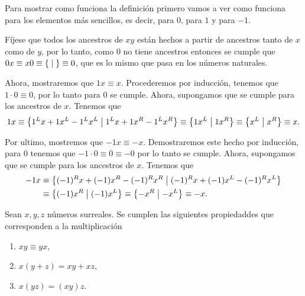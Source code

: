     \begin{example}
        Para mostrar como funciona la definici\'on primero vamos a ver como funciona para los elementos m\'as sencillos, es decir, para $0$, para $1$ y para $-1$.

        F\'ijese que todos los ancestros de $xy$ est\'an hechos a partir de ancestros tanto de $x$ como de $y$, por lo tanto, como $0$ no tiene ancestros entonces se cumple que $0x \equiv x0 \equiv \left\{\;\middle|\; \right\} \equiv 0$, que es lo mismo que pasa en los n\'umeros naturales.
        
        Ahora, mostraremos que $1x \equiv x$. Procederemos por inducci\'on, tenemos que $1\cdot 0 \equiv 0$, por lo tanto para $0$ se cumple. Ahora, supongamos que se cumple para los ancestros de $x$. Tenemos que 
        \[
            1x \equiv \left\{1^Lx + 1x^L - 1^Lx^L\;\middle|\; 1^Lx + 1x^R - 1^Lx^R\right\} \equiv \left\{1x^L\;\middle|\; 1x^R\right\} \equiv \left\{x^L\;\middle|\; x^R\right\} \equiv x.
        \]

        Por ultimo, mostremos que $-1x \equiv -x$. Demostraremos este hecho por inducci\'on, para $0$ tenemos que $-1\cdot 0\equiv 0 \equiv -0$ por lo tanto se cumple. Ahora, supongamos que se cumple para los ancestros de $x$. Tenemos que 
        \begin{align*}
            -1x & \equiv \left\{(-1)^Rx + (-1)x^R - (-1)^Rx^R\;\middle|\; (-1)^Rx + (-1)x^L - (-1)^Rx^L\right\} \\
             & \equiv \left\{(-1)x^R\;\middle|\; (-1)x^L\right\} \equiv \left\{-x^R\;\middle|\; -x^L\right\} \equiv -x.
        \end{align*}
    \end{example}

    \begin{theorem}
        Sean $x,y,z$ n\'umeros surreales. Se cumplen las siguientes propiedaddes que corresponden a la multiplicaci\'on
        \begin{enumerate}[nosep]
            \item $xy\equiv yx$,
            \item $x(y+z) = xy + xz$,
            \item $x(yz) = (xy)z$.
        \end{enumerate}
    \end{theorem}

